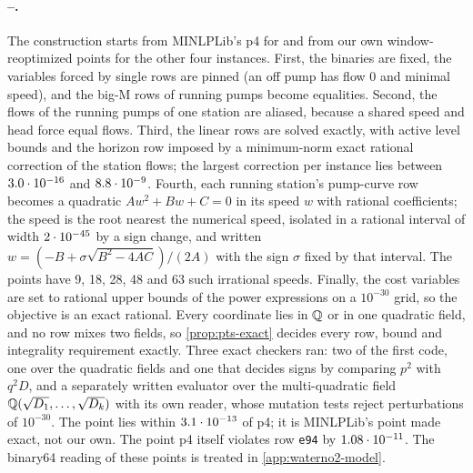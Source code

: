 \paragraph{--.}
The construction starts from MINLPLib's p4 for  and from our own window-reoptimized points for the other four instances.
First, the binaries are fixed, the variables forced by single rows are pinned (an off pump has flow $0$ and minimal speed), and the big-M rows of running pumps become equalities.
Second, the flows of the running pumps of one station are aliased, because a shared speed and head force equal flows.
Third, the linear rows are solved exactly, with active level bounds and the horizon row imposed by a minimum-norm exact rational correction of the station flows; the largest correction per instance lies between $3.0\cdot 10^{-16}$ and $8.8\cdot 10^{-9}$.
Fourth, each running station's pump-curve row becomes a quadratic $Aw^2+Bw+C=0$ in its speed $w$ with rational coefficients; the speed is the root nearest the numerical speed, isolated in a rational interval of width $2\cdot 10^{-45}$ by a sign change, and written $w=(-B+\sigma\sqrt{B^2-4AC})/(2A)$ with the sign $\sigma$ fixed by that interval.
The points have 9, 18, 28, 48 and 63 such irrational speeds.
Finally, the cost variables are set to rational upper bounds of the power expressions on a $10^{-30}$ grid, so the objective is an exact rational.
Every coordinate lies in $\mathbb{Q}$ or in one quadratic field, and no row mixes two fields, so \cref{prop:pts-exact} decides every row, bound and integrality requirement exactly.
Three exact checkers ran: two of the first code, one over the quadratic fields and one that decides signs by comparing $p^2$ with $q^2D$, and a separately written evaluator over the multi-quadratic field $\mathbb{Q}(\sqrt{D_1},\dots,\sqrt{D_k})$ with its own reader, whose mutation tests reject perturbations of $10^{-30}$.
The  point lies within $3.1\cdot 10^{-13}$ of p4; it is MINLPLib's point made exact, not our own.
The point p4 itself violates row \texttt{e94} by $1.08\cdot 10^{-11}$.
The binary64 reading of these points is treated in \cref{app:waterno2-model}.

